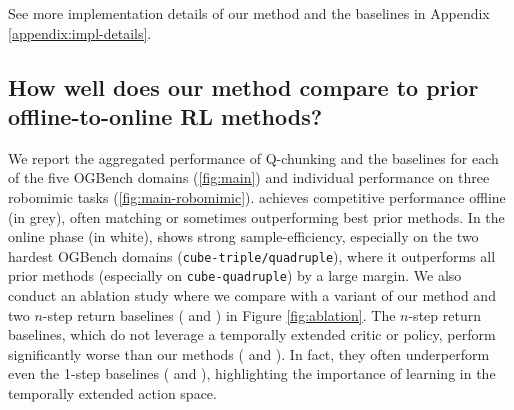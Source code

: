 See more implementation details of our method and the baselines in Appendix \ref{appendix:impl-details}. %



















\subsection{How well does our method compare to prior offline-to-online RL methods?}
\label{sec:results-analysis}
We report the aggregated performance of Q-chunking and the baselines for each of the five OGBench domains (\cref{fig:main}) and individual performance on three robomimic tasks (\cref{fig:main-robomimic}).  achieves competitive performance offline (in grey), often matching or sometimes outperforming best prior methods. In the online phase (in white),  shows strong sample-efficiency, especially on the two hardest OGBench domains (\texttt{cube-triple/quadruple}), where it outperforms all prior methods (especially on \texttt{cube-quadruple}) by a large margin. We also conduct an ablation study where we compare  with a variant of our method  and two $n$-step return baselines ( and ) in Figure \ref{fig:ablation}. The $n$-step return baselines, which do not leverage a temporally extended critic or policy, perform significantly worse than our methods ( and ). In fact, they often underperform even the 1-step baselines ( and ), highlighting the importance of learning in the temporally extended action space.















